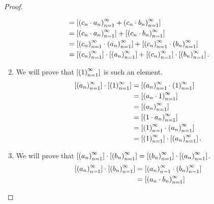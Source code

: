 \begin{proof}
\begin{enumerate}[label={(F\arabic*)},itemsep=0pt,topsep=0pt,start=5]
\begin{align*}
                                                                                                 & = \left[{{\left({c_{n}\cdot a_{n}}\right)}^{\infty}_{n=1} + {\left({c_{n}\cdot b_{n}}\right)}^{\infty}_{n=1}}\right]                                                                       \\
                                                                                                 & = \left[{{\left({c_{n}\cdot a_{n}}\right)}^{\infty}_{n=1}}\right] + \left[{{\left({c_{n}\cdot b_{n}}\right)}^{\infty}_{n=1}}\right]                                                               \\
                                                                                                 & = \left[{{\left({c_{n}}\right)}^{\infty}_{n=1}\cdot{\left({a_{n}}\right)}^{\infty}_{n=1}}\right] + \left[{{\left({c_{n}}\right)}^{\infty}_{n=1}\cdot{\left({b_{n}}\right)}^{\infty}_{n=1}}\right]                                                     \\
                                                                                                 & = \left[{{\left({c_{n}}\right)}^{\infty}_{n=1}}\right]\cdot\left[{{\left({a_{n}}\right)}^{\infty}_{n=1}}\right] + \left[{{\left({c_{n}}\right)}^{\infty}_{n=1}}\right]\cdot\left[{{\left({b_{n}}\right)}^{\infty}_{n=1}}\right].
              \end{align*}
        \item We will prove that $\left[{{\left({1}\right)}^{\infty}_{n=1}}\right]$ is such an element.
              \begin{align*}
                  \left[{{\left({a_{n}}\right)}^{\infty}_{n=1}}\right]\cdot\left[{{\left({1}\right)}^{\infty}_{n=1}}\right] & = \left[{{\left({a_{n}}\right)}^{\infty}_{n=1}\cdot{\left({1}\right)}^{\infty}_{n=1}}\right]          \\
                                                          & = \left[{{\left({a_{n}\cdot 1}\right)}^{\infty}_{n=1}}\right]               \\
                                                          & = \left[{{\left({a_{n}}\right)}^{\infty}_{n=1}}\right]                      \\
                                                          & = \left[{{\left({1\cdot a_{n}}\right)}^{\infty}_{n=1}}\right]               \\
                                                          & = \left[{{\left({1}\right)}^{\infty}_{n=1}\cdot{\left({a_{n}}\right)}^{\infty}_{n=1}}\right]          \\
                                                          & = \left[{{\left({1}\right)}^{\infty}_{n=1}}\right]\cdot\left[{{\left({a_{n}}\right)}^{\infty}_{n=1}}\right].
              \end{align*}
        \item We will prove that $\left[{{\left({a_{n}}\right)}^{\infty}_{n=1}}\right]\cdot\left[{{\left({b_{n}}\right)}^{\infty}_{n=1}}\right] = \left[{{\left({b_{n}}\right)}^{\infty}_{n=1}}\right]\cdot\left[{{\left({a_{n}}\right)}^{\infty}_{n=1}}\right]$.
              \begin{align*}
                  \class{\seq{a_{n}}}\cdot\class{\seq{b_{n}}} & = \class{\seq{a_{n}}\cdot\seq{b_{n}}}          \\
                                                              & = \class{\seq{a_{n}\cdot b_{n}}}               \\

\end{align*}
\end{enumerate}
\end{proof}
